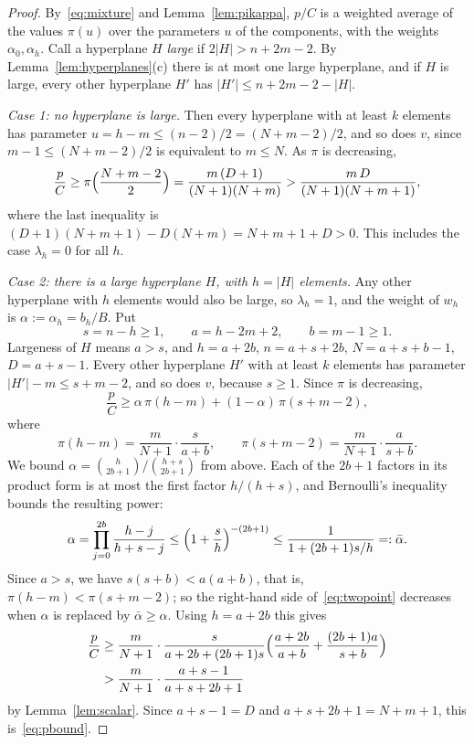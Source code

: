 \documentclass[11pt]{amsart}
\theoremstyle{definition}
\theoremstyle{remark}
\numberwithin{equation}{section}
\begin{document}
\begin{proof}
By~\eqref{eq:mixture} and Lemma~\ref{lem:pikappa}, $p/C$ is a weighted average of the values $\pi(u)$ over the parameters $u$ of the components, with the weights $\alpha_0,\alpha_h$. Call a hyperplane $H$ \emph{large} if $2|H|>n+2m-2$. By Lemma~\ref{lem:hyperplanes}(c) there is at most one large hyperplane, and if $H$ is large, every other hyperplane $H'$ has $|H'|\le n+2m-2-|H|$.

\emph{Case 1: no hyperplane is large.} Then every hyperplane with at least $k$ elements has parameter $u=h-m\le(n-2)/2=(N+m-2)/2$, and so does $v$, since $m-1\le(N+m-2)/2$ is equivalent to $m\le N$. As $\pi$ is decreasing,
\[
\frac pC\ge\pi\Bigl(\frac{N+m-2}{2}\Bigr)=\frac{m\,(D+1)}{(N+1)(N+m)}>\frac{m\,D}{(N+1)(N+m+1)},
\]
where the last inequality is $(D+1)(N+m+1)-D(N+m)=N+m+1+D>0$. This includes the case $\lambda_h=0$ for all $h$.

\emph{Case 2: there is a large hyperplane $H$, with $h=|H|$ elements.} Any other hyperplane with $h$ elements would also be large, so $\lambda_h=1$, and the weight of $w_h$ is $\alpha:=\alpha_h=b_h/B$. Put
\[
s=n-h\ge1,\qquad a=h-2m+2,\qquad b=m-1\ge1 .
\]
Largeness of $H$ means $a>s$, and $h=a+2b$, $n=a+s+2b$, $N=a+s+b-1$, $D=a+s-1$. Every other hyperplane $H'$ with at least $k$ elements has parameter $|H'|-m\le s+m-2$, and so does $v$, because $s\ge1$. Since $\pi$ is decreasing,
\begin{equation}\label{eq:twopoint}
\frac pC\ge\alpha\,\pi(h-m)+(1-\alpha)\,\pi(s+m-2),
\end{equation}
where
\[
\pi(h-m)=\frac{m}{N+1}\cdot\frac{s}{a+b},\qquad \pi(s+m-2)=\frac{m}{N+1}\cdot\frac{a}{s+b}.
\]
We bound $\alpha=\binom{h}{2b+1}/\binom{h+s}{2b+1}$ from above. Each of the $2b+1$ factors in its product form is at most the first factor $h/(h+s)$, and Bernoulli's inequality bounds the resulting power:
\[
\alpha=\prod_{j=0}^{2b}\frac{h-j}{h+s-j}\le\Bigl(1+\frac sh\Bigr)^{-(2b+1)}\le\frac{1}{1+(2b+1)s/h}=:\bar\alpha .
\]
Since $a>s$, we have $s(s+b)<a(a+b)$, that is, $\pi(h-m)<\pi(s+m-2)$; so the right-hand side of~\eqref{eq:twopoint} decreases when $\alpha$ is replaced by $\bar\alpha\ge\alpha$. Using $h=a+2b$ this gives
\begin{align*}
\frac pC&\ge\frac{m}{N+1}\cdot\frac{s}{a+2b+(2b+1)s}\Bigl(\frac{a+2b}{a+b}+\frac{(2b+1)a}{s+b}\Bigr)\\
&>\frac{m}{N+1}\cdot\frac{a+s-1}{a+s+2b+1}
\end{align*}
by Lemma~\ref{lem:scalar}. Since $a+s-1=D$ and $a+s+2b+1=N+m+1$, this is~\eqref{eq:pbound}.
\end{proof}
\end{document}
